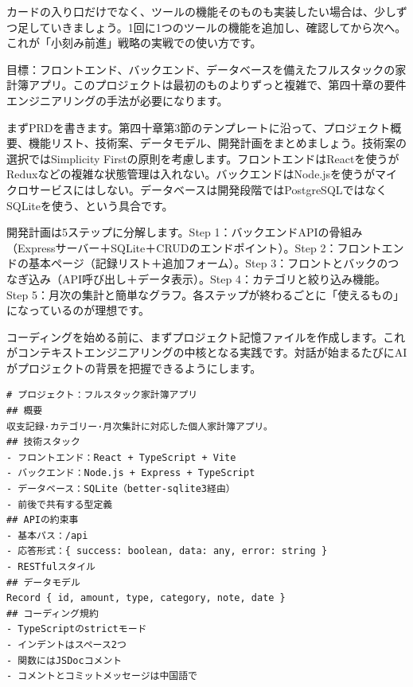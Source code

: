 カードの入り口だけでなく、ツールの機能そのものも実装したい場合は、少しずつ足していきましょう。1回に1つのツールの機能を追加し、確認してから次へ。これが「小刻み前進」戦略の実戦での使い方です。



目標：フロントエンド、バックエンド、データベースを備えたフルスタックの家計簿アプリ。このプロジェクトは最初のものよりずっと複雑で、第四十章の要件エンジニアリングの手法が必要になります。

まずPRDを書きます。第四十章第3節のテンプレートに沿って、プロジェクト概要、機能リスト、技術案、データモデル、開発計画をまとめましょう。技術案の選択ではSimplicity Firstの原則を考慮します。フロントエンドはReactを使うがReduxなどの複雑な状態管理は入れない。バックエンドはNode.jsを使うがマイクロサービスにはしない。データベースは開発段階ではPostgreSQLではなくSQLiteを使う、という具合です。

開発計画は5ステップに分解します。Step 1：バックエンドAPIの骨組み（Expressサーバー＋SQLite＋CRUDのエンドポイント）。Step 2：フロントエンドの基本ページ（記録リスト＋追加フォーム）。Step 3：フロントとバックのつなぎ込み（API呼び出し＋データ表示）。Step 4：カテゴリと絞り込み機能。Step 5：月次の集計と簡単なグラフ。各ステップが終わるごとに「使えるもの」になっているのが理想です。


コーディングを始める前に、まずプロジェクト記憶ファイルを作成します。これがコンテキストエンジニアリングの中核となる実践です。対話が始まるたびにAIがプロジェクトの背景を把握できるようにします。

\begin{lstlisting}
# プロジェクト：フルスタック家計簿アプリ
## 概要
収支記録·カテゴリー·月次集計に対応した個人家計簿アプリ。
## 技術スタック
- フロントエンド：React + TypeScript + Vite
- バックエンド：Node.js + Express + TypeScript
- データベース：SQLite（better-sqlite3経由）
- 前後で共有する型定義
## APIの約束事
- 基本パス：/api
- 応答形式：{ success: boolean, data: any, error: string }
- RESTfulスタイル
## データモデル
Record { id, amount, type, category, note, date }
## コーディング規約
- TypeScriptのstrictモード
- インデントはスペース2つ
- 関数にはJSDocコメント
- コメントとコミットメッセージは中国語で
\end{lstlisting}


